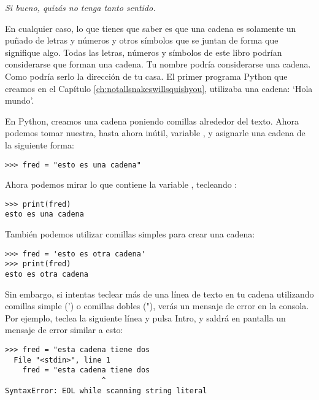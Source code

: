 \noindent
\emph{Si bueno, quizás no tenga tanto sentido.}

En cualquier caso, lo que tienes que saber es que una cadena es solamente un puñado de letras y números y otros símbolos que se juntan de forma que signifique algo. Todas las letras, números y símbolos de este libro podrían considerarse que forman una cadena. Tu nombre podría considerarse una cadena. Como podría serlo la dirección de tu casa.  El primer programa Python que creamos en el Capítulo \ref{ch:notallsnakeswillsquishyou}, utilizaba una cadena: `Hola mundo'.
\par
En Python, creamos una cadena poniendo comillas alrededor del texto. Ahora podemos tomar nuestra, hasta ahora inútil, variable , y asignarle una cadena de la siguiente forma:

\begin{listing}
\begin{verbatim}
>>> fred = "esto es una cadena"
\end{verbatim}
\end{listing}

\noindent
Ahora podemos mirar lo que contiene la variable , tecleando :

\begin{listing}
\begin{verbatim}
>>> print(fred)
esto es una cadena
\end{verbatim}
\end{listing}

\noindent
También podemos utilizar comillas simples para crear una cadena:

\begin{listing}
\begin{verbatim}
>>> fred = 'esto es otra cadena'
>>> print(fred)
esto es otra cadena
\end{verbatim}
\end{listing}

Sin embargo, si intentas teclear más de una línea de texto en tu cadena utilizando comillas simple (') o comillas dobles ("), verás un mensaje de error en la consola. Por ejemplo, teclea la siguiente línea y pulsa Intro, y saldrá en pantalla un mensaje de error similar a esto:

\begin{listing}
\begin{verbatim}
>>> fred = "esta cadena tiene dos
  File "<stdin>", line 1
    fred = "esta cadena tiene dos
                      ^
SyntaxError: EOL while scanning string literal
\end{verbatim}
\end{listing}

